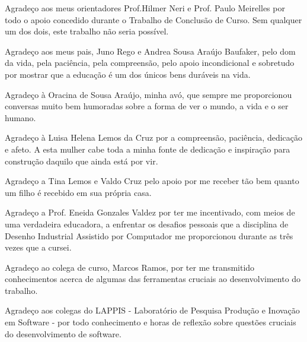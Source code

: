 \begin{agradecimentos}
Agradeço aos meus orientadores Prof.Hilmer Neri e Prof. Paulo Meirelles por 
todo o apoio concedido durante o Trabalho de Conclusão de Curso. 
Sem qualquer um dos dois, este trabalho não seria possível.

Agradeço aos meus pais, Juno Rego e Andrea Sousa Araújo Baufaker, pelo dom da 
vida, pela paciência, pela compreensão, pelo apoio incondicional e sobretudo 
por mostrar que a educação é um dos únicos bens duráveis na vida.

Agradeço à Oracina de Sousa Araújo, minha avó, que sempre me proporcionou 
conversas muito bem humoradas sobre a forma de ver o mundo, a vida e o ser 
humano.

Agradeço à Luisa Helena Lemos da Cruz por a compreensão, paciência, dedicação e
afeto. A esta mulher cabe toda a minha fonte de dedicação e inspiração para 
construção daquilo que ainda está por vir.

Agradeço a Tina Lemos e Valdo Cruz pelo apoio por me receber tão bem quanto um 
filho é recebido em sua própria casa.

Agradeço a Prof. Eneida Gonzales Valdez por ter me incentivado, com meios de uma
verdadeira educadora, a enfrentar os desafios pessoais que a disciplina de 
Desenho Industrial Assistido por Computador me proporcionou durante as três 
vezes que a cursei.

Agradeço ao colega de curso, Marcos Ramos, por ter me transmitido conhecimentos 
acerca de algumas das ferramentas cruciais ao desenvolvimento do trabalho.

Agradeço aos colegas do LAPPIS - Laboratório de Pesquisa Produção e Inovação em 
Software - por todo conhecimento e horas de reflexão sobre questões cruciais do
desenvolvimento de software.

\end{agradecimentos}
